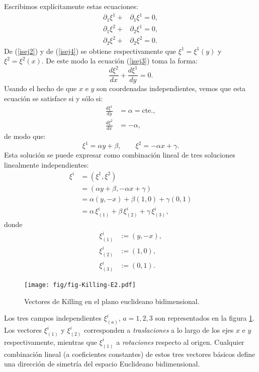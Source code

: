 Escribimos explícitamente estas ecuaciones:%
\begin{align}
\partial_1\xi^1+ & \partial_1\xi^1= 0, \label{isej2}\\
\partial_1\xi^2+ & \partial_2\xi^1= 0, \label{isej3} \\
\partial_2\xi^2+ & \partial_2\xi^2= 0.  \label{isej4}
\end{align}
De (\ref{isej2}) y de (\ref{isej4}) se obtiene respectivamente que $\xi
^1=\xi^1(y)$ y $\xi^2=\xi^2(x)$. De este modo la ecuación (\ref{isej3}) toma la forma:
\begin{equation}
\frac{d\xi^2}{dx}+\frac{d\xi^1}{dy}=0.  \label{isej5}%
\end{equation}
Usando el hecho de que $x$ e $y$ son coordenadas independientes, vemos que
esta ecuación se satisface si y sólo si:
\begin{align}
\frac{d\xi^1}{dy}  &  =\alpha=\text{cte.},\label{isej6}\\
\frac{d\xi^2}{dx}  &  =-\alpha, \nonumber
\end{align}
de modo que:
\begin{equation}
\xi^1 =\alpha y+\beta, \qquad
\xi^2 =-\alpha x+\gamma. \label{isej7}
\end{equation}
Esta solución se puede expresar como combinación lineal de tres
soluciones linealmente independientes:
\begin{align}
\xi^i  &  =\left(  \xi^1,\xi^2\right)  \\
& =\left(  \alpha y+\beta,-\alpha x+\gamma\right) \\
  &  =\alpha\left(  y,-x\right)  +\beta\left(  1,0\right)
+\gamma\left(  0,1\right)  \\
 &  =\alpha\,\xi_{(1)}^i+\beta\,\xi_{(2)}^i+\gamma\,\xi_{(3)}^i, \nonumber
\end{align}
donde
\begin{align}
\xi_{(1)}^i  &  :=\left(  y,-x\right)  ,\\
\xi_{(2)}^i  &  :=\left(  1,0\right)  ,\\
\xi_{(3)}^i  &  :=\left(  0,1\right)  .
\end{align}
\begin{center}
\begin{figure}[H]
\centerline{\texttt{[image: fig/fig-Killing-E2.pdf]}}
\caption{Vectores de Killing en el plano euclideano bidimensional.}
\label{KE2}
\end{figure}
\end{center}
Los tres campos independientes $\xi^i_{(a)}$, $a=1,2,3$ son representados en la figura \ref{KE2}. Los vectores $\xi^i_{(1)}$ y $\xi^i_{(2)}$ corresponden a \textit{traslaciones} a lo largo de los ejes $x$ e $y$ respectivamente, mientras que $\xi^i_{(1)}$ a \textit{rotaciones} respecto al origen. Cualquier combinación lineal (a coeficientes constantes) de estos tres vectores básicos define una dirección de simetría del espacio Euclideano bidimensional.

